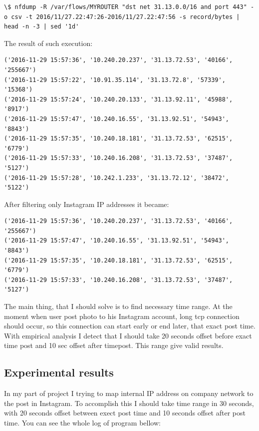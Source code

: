 \begin{lstlisting}
\$ nfdump -R /var/flows/MYROUTER "dst net 31.13.0.0/16 and port 443" -o csv -t 2016/11/27.22:47:26-2016/11/27.22:47:56 -s record/bytes | head -n -3 | sed '1d'
\end{lstlisting}

The result of such execution:

\begin{lstlisting}
('2016-11-29 15:57:36', '10.240.20.237', '31.13.72.53', '40166', '255667')
('2016-11-29 15:57:22', '10.91.35.114', '31.13.72.8', '57339', '15368')
('2016-11-29 15:57:24', '10.240.20.133', '31.13.92.11', '45988', '8917')
('2016-11-29 15:57:47', '10.240.16.55', '31.13.92.51', '54943', '8843')
('2016-11-29 15:57:35', '10.240.18.181', '31.13.72.53', '62515', '6779')
('2016-11-29 15:57:33', '10.240.16.208', '31.13.72.53', '37487', '5127')
('2016-11-29 15:57:28', '10.242.1.233', '31.13.72.12', '38472', '5122')
\end{lstlisting}

After filtering only Instagram IP addresses it became:

\begin{lstlisting}
('2016-11-29 15:57:36', '10.240.20.237', '31.13.72.53', '40166', '255667')
('2016-11-29 15:57:47', '10.240.16.55', '31.13.92.51', '54943', '8843')
('2016-11-29 15:57:35', '10.240.18.181', '31.13.72.53', '62515', '6779')
('2016-11-29 15:57:33', '10.240.16.208', '31.13.72.53', '37487', '5127')
\end{lstlisting}

The main thing, that I should solve is to find necessary time range. At the moment when user post photo to his Instagram account, long tcp connection should occur, so this connection can start early or end later, that exact post time. With empirical analysis I detect that I should take 20 seconds offset before exact time post and 10 sec offset after timepost. This range give valid results.

\subsection{Experimental results}
In my part of project I trying to map internal IP address on company network to the post in Instagram. To accomplish this I should take time range in 30 seconds, with 20 seconds offset between exect post time and 10 seconds offset after post time. You can see the whole log of program bellow:

